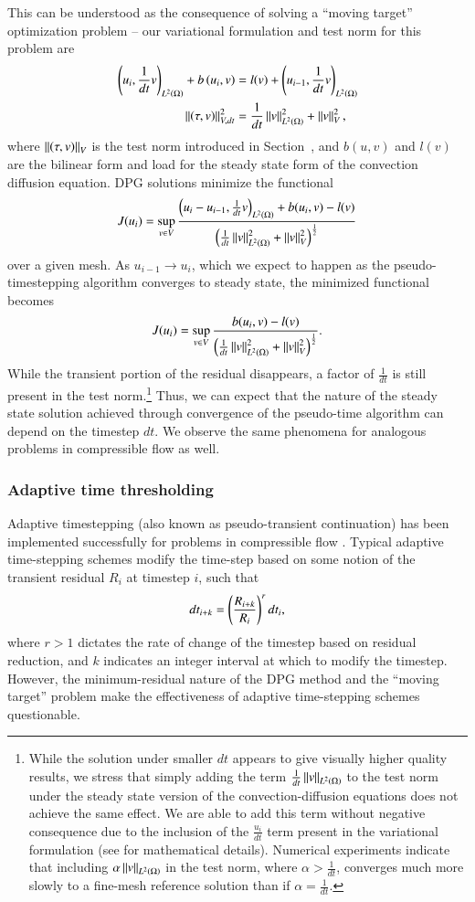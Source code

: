 This can be understood as the consequence of solving a ``moving target'' optimization problem -- our variational formulation and test norm for this problem are
\begin{align*}
\LRp{u_{i}, \frac{1}{dt}v}_{\L} + b\LRp{u_i,v} &= l(v) + \LRp{u_{i-1},\frac{1}{dt}v}_{\L}\\
\nor{\LRp{\tau,v}}_{V,dt}^2 &= \frac{1}{dt}\nor{v}_{\L}^2 + \nor{v}_V^2,
\end{align*}
where $\nor{\LRp{\tau,v}}_{V}$ is the test norm introduced in Section~, and $b(u,v)$ and $l(v)$ are the bilinear form and load for the steady state form of the convection diffusion equation.  DPG solutions minimize the functional 
\[
J(u_i) = \sup_{v\in V} \frac{\LRp{u_{i}-u_{i-1}, \frac{1}{dt}v}_{\L} + b(u_i,v) - l(v)}{\LRp{\frac{1}{dt}\nor{v}_{\L}^2 + \nor{v}_V^2}^{\frac{1}{2}}}
\]
over a given mesh.  As $u_{i-1}\rightarrow u_{i}$, which we expect to happen as the pseudo-timestepping algorithm converges to steady state, the minimized functional becomes
\[
J(u_i) = \sup_{v\in V} \frac{b(u_i,v) - l(v)}{\LRp{\frac{1}{dt}\nor{v}_{\L}^2 + \nor{v}_V^2}^{\frac{1}{2}}}.
\]
While the transient portion of the residual disappears, a factor of $\frac{1}{dt}$ is still present in the test norm.\footnote{While the solution under smaller $dt$ appears to give visually higher quality results, we stress that simply adding the term $\frac{1}{dt}\nor{v}_{\L}$ to the test norm under the steady state version of the convection-diffusion equations does not achieve the same effect.  We are able to add this term without negative consequence due to the inclusion of the $\frac{u_i}{dt}$ term present in the variational formulation (see \cite{DPGrobustness,DPGrobustness2} for mathematical details).  Numerical experiments indicate that including $\alpha\nor{v}_{\L}$ in the test norm, where $\alpha > \frac{1}{dt}$, converges much more slowly to a fine-mesh reference solution than if $\alpha = \frac{1}{dt}$.}  Thus, we can expect that the nature of the steady state solution achieved through convergence of the pseudo-time algorithm can depend on the timestep $dt$.  We observe the same phenomena for analogous problems in compressible flow as well.  

\subsubsection{Adaptive time thresholding}

Adaptive timestepping (also known as pseudo-transient continuation) has been implemented successfully for problems in compressible flow \cite{BenKirk}. Typical adaptive time-stepping schemes modify the time-step based on some notion of the transient residual $R_i$ at timestep $i$, such that
\[
dt_{i+k} = \LRp{\frac{R_{i+k}}{R_i}}^r dt_i,
\]
where $r > 1$ dictates the rate of change of the timestep based on residual reduction, and $k$ indicates an integer interval at which to modify the timestep.  However, the minimum-residual nature of the DPG method and the ``moving target'' problem make the effectiveness of adaptive time-stepping schemes questionable.  

